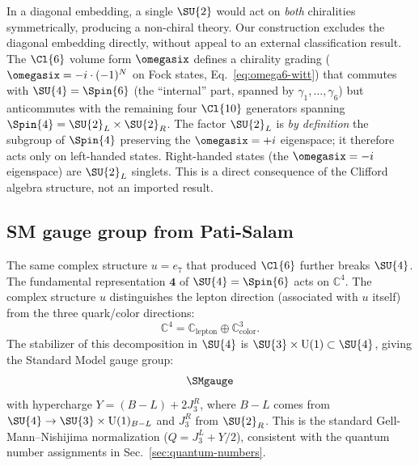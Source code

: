 \begin{remark}\label{rem:left-vs-diag}
In a diagonal embedding, a single $\SU{2}$ would act on
\emph{both} chiralities symmetrically, producing a non-chiral
theory.  Our construction excludes the diagonal embedding
directly, without appeal to an external classification result.
The $\Cl{6}$ volume form $\omegasix$ defines a chirality
grading ($\omegasix = -i\cdot(-1)^N$ on Fock states,
Eq.~\eqref{eq:omega6-witt}) that commutes with
$\SU{4} = \Spin{6}$ (the ``internal'' part, spanned by
$\gamma_1,\ldots,\gamma_6$) but anticommutes with the remaining
four $\Cl{10}$ generators spanning
$\Spin{4} = \SU{2}_L\times\SU{2}_R$.  The factor $\SU{2}_L$
is \emph{by definition} the subgroup of $\Spin{4}$ preserving
the $\omegasix = +i$ eigenspace; it therefore acts only on
left-handed states.  Right-handed states (the $\omegasix = -i$
eigenspace) are $\SU{2}_L$ singlets.  This is a direct
consequence of the Clifford algebra structure, not an imported
result.
\end{remark}

\subsection{SM gauge group from Pati-Salam}\label{sec:SM-gauge}

The same complex structure $u=e_7$ that produced $\Cl{6}$ further
breaks $\SU{4}$.  The fundamental representation $\mathbf{4}$ of
$\SU{4} = \Spin{6}$ acts on $\mathbb{C}^4$.  The complex structure
$u$ distinguishes the lepton direction (associated with $u$ itself)
from the three quark/color directions:
\begin{equation}\label{eq:SU4-break}
  \mathbb{C}^4 = \mathbb{C}_{\text{lepton}} \oplus \mathbb{C}^3_{\text{color}}.
\end{equation}
The stabilizer of this decomposition in $\SU{4}$ is
$\SU{3}\times\mathrm{U}(1)\subset\SU{4}$,
giving the Standard Model gauge group:
\begin{equation}\label{eq:SM-gauge}
  \SMgauge
\end{equation}
with hypercharge $Y = (B-L) + 2J_3^R$, where $B-L$ comes from
$\SU{4}\to\SU{3}\times\mathrm{U}(1)_{B-L}$
and $J_3^R$ from $\SU{2}_R$.  This is the standard
Gell-Mann--Nishijima normalization ($Q = J_3^L + Y/2$), consistent
with the quantum number assignments in
Sec.~\ref{sec:quantum-numbers}.

